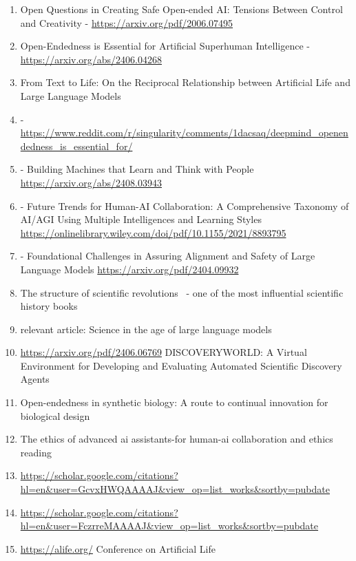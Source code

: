 \documentclass{article}
\begin{document}
\begin{enumerate}
    \item Open Questions in Creating Safe Open-ended AI: Tensions Between Control and Creativity - \url{https://arxiv.org/pdf/2006.07495}

    \item Open-Endedness is Essential for Artificial Superhuman Intelligence - \url{https://arxiv.org/abs/2406.04268}

    \item From Text to Life: On the Reciprocal Relationship between Artificial Life and Large Language Models \cite{nisioti2024text}

    \item - \url{https://www.reddit.com/r/singularity/comments/1dacsaq/deepmind_openendedness_is_essential_for/}

    \item - Building Machines that Learn and Think with People
 \url{https://arxiv.org/abs/2408.03943}

    \item - Future Trends for Human-AI Collaboration: A Comprehensive Taxonomy of AI/AGI Using Multiple Intelligences and Learning Styles \url{https://onlinelibrary.wiley.com/doi/pdf/10.1155/2021/8893795}

    \item - Foundational Challenges in Assuring Alignment and Safety of Large Language Models \url{https://arxiv.org/pdf/2404.09932}

    \item The structure of scientific revolutions~\cite{kuhn1997structure} - one of the most influential scientific history books

    \item relevant article: Science in the age of large language models~\cite{birhane2023science}

    \item \url{https://arxiv.org/pdf/2406.06769} DISCOVERYWORLD: A Virtual Environment for Developing and Evaluating Automated Scientific Discovery Agents

    \item Open-endedness in synthetic biology: A route to continual innovation for biological design \cite{stock2024open}
    

    \item The ethics of advanced ai assistants-for human-ai collaboration and ethics reading \cite{gabriel2024ethics}

    \item \url{https://scholar.google.com/citations?hl=en&user=GcvxHWQAAAAJ&view_op=list_works&sortby=pubdate}

    \item \url{https://scholar.google.com/citations?hl=en&user=FczrreMAAAAJ&view_op=list_works&sortby=pubdate}

    \item \url{https://alife.org/} Conference on Artificial Life
    
\end{enumerate}
\end{document}
